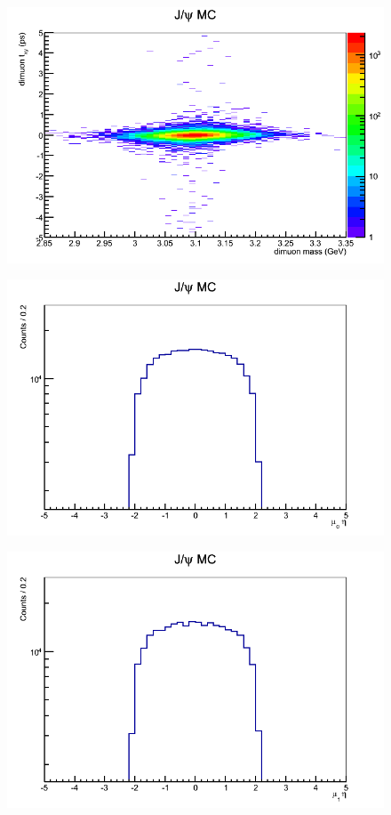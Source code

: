 \documentclass[a4paper,12pt]{article}
\begin{document}
\begin{figure}[]
    \centering
      \includegraphics[scale=0.5]{Images/dimuon_mass_vs_dimuon_tau_xy.png}
    \caption{}
\end{figure}
\begin{figure}[]
    \centering
      \includegraphics[scale=0.5]{Images/mu0_eta.png}
    \caption{}
\end{figure}
\begin{figure}[]
    \centering
      \includegraphics[scale=0.5]{Images/mu1_eta.png}
    \caption{}
\end{figure}
\end{document}
